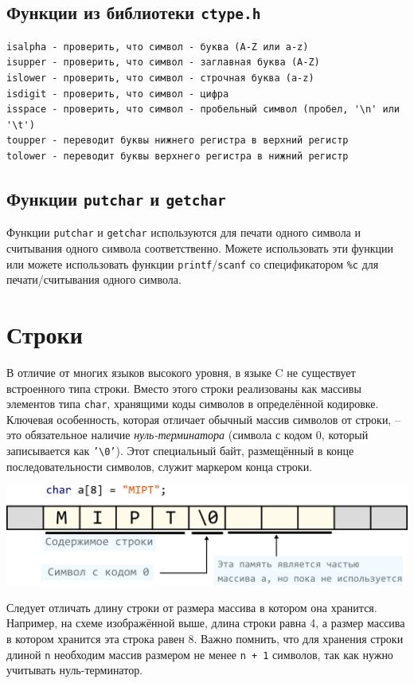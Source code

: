 \documentclass[10pt]{article}
\begin{document}
\subsection*{Функции из библиотеки \texttt{ctype.h}}
\begin{verbatim}
isalpha - проверить, что символ - буква (A-Z или a-z)
isupper - проверить, что символ - заглавная буква (A-Z)
islower - проверить, что символ - строчная буква (a-z)
isdigit - проверить, что символ - цифра
isspace - проверить, что символ - пробельный символ (пробел, '\n' или '\t')
toupper - переводит буквы нижнего регистра в верхний регистр
tolower - переводит буквы верхнего регистра в нижний регистр
\end{verbatim}


\subsection*{Функции \texttt{putchar} и \texttt{getchar}}
Функции \texttt{putchar} и \texttt{getchar} используются для печати одного символа и считывания одного символа соответственно. Можете использовать эти функции или можете использовать функции \texttt{printf}/\texttt{scanf} со спецификатором \texttt{\%c} для печати/считывания одного символа.


\section*{Строки}
В отличие от многих языков высокого уровня, в языке C не существует встроенного типа строки. Вместо этого строки реализованы как массивы элементов типа \texttt{char}, хранящими коды символов в определённой кодировке. Ключевая особенность, которая отличает обычный массив символов от строки, -- это обязательное наличие \textit{нуль-терминатора} (символа с кодом 0, который записывается как \texttt{'\textbackslash 0'}). Этот специальный байт, размещённый в конце последовательности символов, служит маркером конца строки.
\begin{center}
\includegraphics[scale=0.75]{../images/string_in_memory.png}
\end{center}
Следует отличать длину строки от размера массива в котором она хранится. Например, на схеме изображённой выше, длина строки равна 4, а размер массива в котором хранится эта строка равен 8. Важно помнить, что для хранения строки длиной \texttt{n} необходим массив размером не менее \texttt{n + 1} символов, так как нужно учитывать нуль-терминатор.
\end{document}
